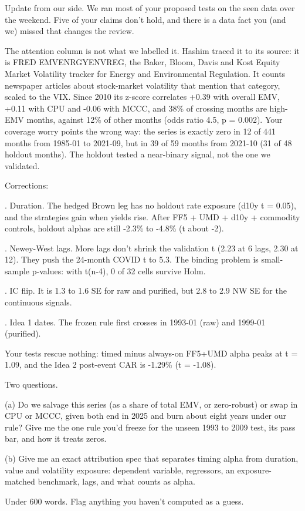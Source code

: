 \par\noindent Update from our side. We ran most of your proposed tests on the seen data over the weekend. Five of your claims don't hold, and there is a data fact you (and we) missed that changes the review.
\medskip
\par\noindent The attention column is not what we labelled it. Hashim traced it to its source: it is FRED EMVENRGYENVREG, the Baker, Bloom, Davis and Kost Equity Market Volatility tracker for Energy and Environmental Regulation. It counts newspaper articles about stock-market volatility that mention that category, scaled to the VIX. Since 2010 its z-score correlates +0.39 with overall EMV, +0.11 with CPU and -0.06 with MCCC, and 38\% of crossing months are high-EMV months, against 12\% of other months (odds ratio 4.5, p = 0.002). Your coverage worry points the wrong way: the series is exactly zero in 12 of 441 months from 1985-01 to 2021-09, but in 39 of 59 months from 2021-10 (31 of 48 holdout months). The holdout tested a near-binary signal, not the one we validated.
\medskip
\par\noindent Corrections:
\par{}. Duration. The hedged Brown leg has no holdout rate exposure (d10y t = 0.05), and the strategies gain when yields rise. After FF5 + UMD + d10y + commodity controls, holdout alphas are still -2.3\% to -4.8\% (t about -2).
\par{}. Newey-West lags. More lags don't shrink the validation t (2.23 at 6 lags, 2.30 at 12). They push the 24-month COVID t to 5.3. The binding problem is small-sample p-values: with t(n-4), 0 of 32 cells survive Holm.
\par{}. IC flip. It is 1.3 to 1.6 SE for raw and purified, but 2.8 to 2.9 NW SE for the continuous signals.
\par{}. Idea 1 dates. The frozen rule first crosses in 1993-01 (raw) and 1999-01 (purified).
\medskip
\par\noindent Your tests rescue nothing: timed minus always-on FF5+UMD alpha peaks at t = 1.09, and the Idea 2 post-event CAR is -1.29\% (t = -1.08).
\medskip
\par\noindent Two questions.
\par\noindent (a) Do we salvage this series (as a share of total EMV, or zero-robust) or swap in CPU or MCCC, given both end in 2025 and burn about eight years under our rule? Give me the one rule you'd freeze for the unseen 1993 to 2009 test, its pass bar, and how it treats zeros.
\par\noindent (b) Give me an exact attribution spec that separates timing alpha from duration, value and volatility exposure: dependent variable, regressors, an exposure-matched benchmark, lags, and what counts as alpha.
\medskip
\par\noindent Under 600 words. Flag anything you haven't computed as a guess.
